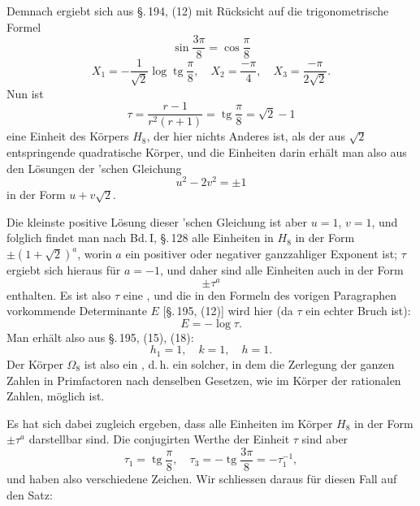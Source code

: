 
Demnach ergiebt sich aus \S.\,194, (12) mit Rücksicht auf die trigonometrische Formel
\[
\sin\frac{3\pi}{8} = \cos\frac{\pi}{8}
\]
\[
X_1 = -\frac{1}{\sqrt{2}} \log \operatorname{tg}\frac{\pi}{8}, \quad X_2 = \frac{-\pi}{4}, \quad X_3 = \frac{-\pi}{2\sqrt{2}}.
\]
Nun ist
\[
\tau = \frac{r-1}{r^2(r+1)} = \operatorname{tg}\frac{\pi}{8} = \sqrt{2} - 1
\]
eine Einheit des Körpers $H_8$, der hier nichts Anderes ist, als der aus $\sqrt{2}$ entspringende quadratische Körper, und die Einheiten darin erhält man also aus den Lösungen der 'schen Gleichung
\[
u^2 - 2v^2 = \pm 1
\]
in der Form $u + v\sqrt{2}$.

Die kleinste positive Lösung dieser 'schen Gleichung ist aber $u = 1$, $v = 1$, und folglich findet man nach Bd.\,I, \S.\,128 alle Einheiten in $H_8$ in der Form $\pm(1+\sqrt{2})^a$, worin $a$ ein positiver oder negativer ganzzahliger Exponent ist; $\tau$ ergiebt sich hieraus für $a = -1$, und daher sind alle Einheiten auch in der Form
\[
\pm \tau^a
\]
enthalten. Es ist also $\tau$ eine , und die in den Formeln des vorigen Paragraphen vorkommende Determinante $E$ [\S.\,195, (12)] wird hier (da $\tau$ ein echter Bruch ist):
\[
E = -\log \tau.
\]
Man erhält also aus \S.\,195, (15), (18):
\[
h_1 = 1, \quad k = 1, \quad h = 1.
\]
Der Körper $\Omega_8$ ist also ein , d.\,h. ein solcher, in dem die Zerlegung der ganzen Zahlen in Primfactoren nach denselben Gesetzen, wie im Körper der rationalen Zahlen, möglich ist.

Es hat sich dabei zugleich ergeben, dass alle Einheiten im Körper $H_8$ in der Form $\pm \tau^a$ darstellbar sind. Die conjugirten Werthe der Einheit $\tau$ sind aber
\[
\tau_1 = \operatorname{tg}\frac{\pi}{8}, \quad \tau_3 = -\operatorname{tg}\frac{3\pi}{8} = -\tau_1^{-1},
\]
und haben also verschiedene Zeichen. Wir schliessen daraus für diesen Fall auf den Satz:
